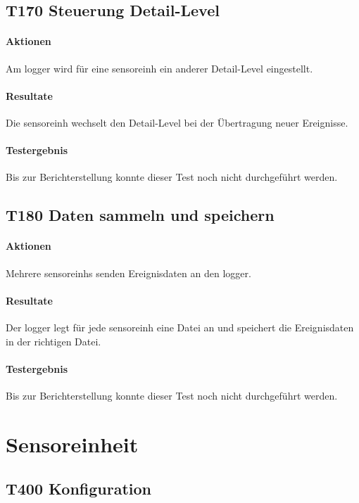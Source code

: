 \subsection{T170 Steuerung Detail-Level}
\paragraph{Aktionen} Am \gls{logger} wird für eine \gls{sensoreinh} ein anderer Detail-Level eingestellt.

\paragraph{Resultate} Die \gls{sensoreinh} wechselt den Detail-Level bei der Übertragung neuer Ereignisse.

\paragraph{Testergebnis} Bis zur Berichterstellung konnte dieser Test noch nicht durchgeführt werden.

\subsection{T180 Daten sammeln und speichern}
\paragraph{Aktionen} Mehrere \glspl{sensoreinh} senden Ereignisdaten an den \gls{logger}. 

\paragraph{Resultate} Der \gls{logger} legt für jede \gls{sensoreinh} eine Datei an und speichert die Ereignisdaten in der richtigen Datei.

\paragraph{Testergebnis} Bis zur Berichterstellung konnte dieser Test noch nicht durchgeführt werden.


\section{Sensoreinheit}
\subsection{T400 Konfiguration}
